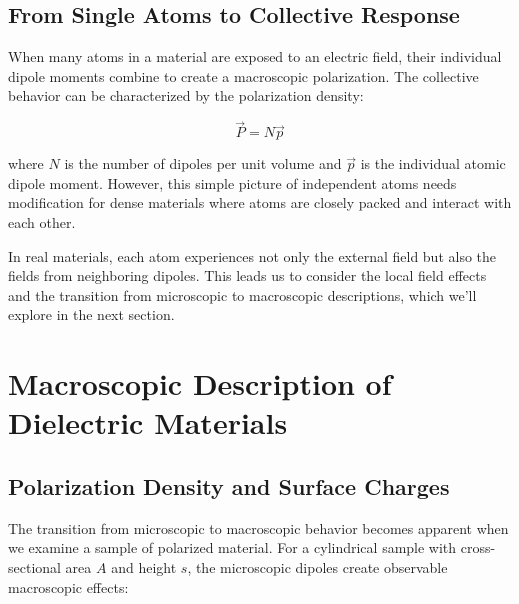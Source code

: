 \documentclass[
  a4paper,
]{book}
\begin{document}
\subsection{From Single Atoms to Collective
Response}\label{from-single-atoms-to-collective-response}

When many atoms in a material are exposed to an electric field, their
individual dipole moments combine to create a macroscopic polarization.
The collective behavior can be characterized by the polarization
density:

\[
\vec{P}=N\vec{p}
\]

where \(N\) is the number of dipoles per unit volume and \(\vec{p}\) is
the individual atomic dipole moment. However, this simple picture of
independent atoms needs modification for dense materials where atoms are
closely packed and interact with each other.

In real materials, each atom experiences not only the external field but
also the fields from neighboring dipoles. This leads us to consider the
local field effects and the transition from microscopic to macroscopic
descriptions, which we'll explore in the next section.

\section{Macroscopic Description of Dielectric
Materials}\label{macroscopic-description-of-dielectric-materials}

\subsection{Polarization Density and Surface
Charges}\label{polarization-density-and-surface-charges}

The transition from microscopic to macroscopic behavior becomes apparent
when we examine a sample of polarized material. For a cylindrical sample
with cross-sectional area \(A\) and height \(s\), the microscopic
dipoles create observable macroscopic effects:
\end{document}
